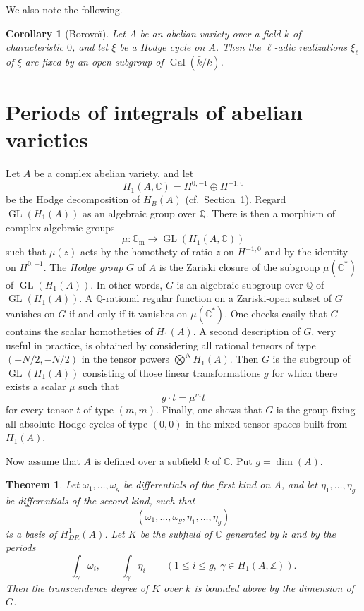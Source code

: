 \documentclass[11pt]{amsart}
\newtheorem{theorem}{Theorem}
\newtheorem{corollary}{Corollary}
\theoremstyle{definition}
\DeclareMathOperator{\Gal}{Gal}
\DeclareMathOperator{\GL}{GL}
\newcommand{\ZZ}{\mathbb{Z}}
\newcommand{\QQ}{\mathbb{Q}}
\newcommand{\CC}{\mathbb{C}}
\newcommand{\Gm}{\mathbb{G}_{\mathrm m}}
\begin{document}
We also note the following.

\begin{corollary}[Borovo\u{i}]
Let $A$ be an abelian variety over a field $k$ of characteristic $0$, and let $\xi$ be a Hodge cycle on $A$. Then the $\ell$-adic realizations $\xi_\ell$ of $\xi$ are fixed by an open subgroup of $\Gal(\bar{k}/k)$.
\end{corollary}

\section{Periods of integrals of abelian varieties}

Let $A$ be a complex abelian variety, and let
\[
H_1(A,\CC)=H^{0,-1}\oplus H^{-1,0}
\]
be the Hodge decomposition of $H_B(A)$ (cf.~Section~1). Regard $\GL(H_1(A))$ as an algebraic group over $\QQ$. There is then a morphism of complex algebraic groups
\[
\mu:\Gm\to \GL(H_1(A,\CC))
\]
such that $\mu(z)$ acts by the homothety of ratio $z$ on $H^{-1,0}$ and by the identity on $H^{0,-1}$. The \emph{Hodge group} $G$ of $A$ is the Zariski closure of the subgroup $\mu(\CC^*)$ of $\GL(H_1(A))$. In other words, $G$ is an algebraic subgroup over $\QQ$ of $\GL(H_1(A))$. A $\QQ$-rational regular function on a Zariski-open subset of $G$ vanishes on $G$ if and only if it vanishes on $\mu(\CC^*)$. One checks easily that $G$ contains the scalar homotheties of $H_1(A)$. A second description of $G$, very useful in practice, is obtained by considering all rational tensors of type $(-N/2,-N/2)$ in the tensor powers $\bigotimes^N H_1(A)$. Then $G$ is the subgroup of $\GL(H_1(A))$ consisting of those linear transformations $g$ for which there exists a scalar $\mu$ such that
\[
g\cdot t = \mu^m t
\]
for every tensor $t$ of type $(m,m)$. Finally, one shows that $G$ is the group fixing all absolute Hodge cycles of type $(0,0)$ in the mixed tensor spaces built from $H_1(A)$.

Now assume that $A$ is defined over a subfield $k$ of $\CC$. Put $g=\dim(A)$.

\begin{theorem}
Let $\omega_1,\dots,\omega_g$ be differentials of the first kind on $A$, and let $\eta_1,\dots,\eta_g$ be differentials of the second kind, such that
\[
(\omega_1,\dots,\omega_g,\eta_1,\dots,\eta_g)
\]
is a basis of $H^1_{DR}(A)$. Let $K$ be the subfield of $\CC$ generated by $k$ and by the periods
\[
\int_\gamma \omega_i,\qquad \int_\gamma \eta_i
\qquad (1\le i\le g,\ \gamma\in H_1(A,\ZZ)).
\]
Then the transcendence degree of $K$ over $k$ is bounded above by the dimension of $G$.
\end{theorem}
\end{document}
